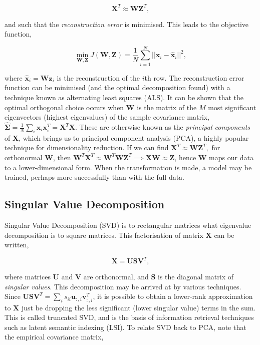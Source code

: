 \documentclass[11pt]{amsart}
\begin{document}
$$\mathbf{X}^T \approx \mathbf{W}\mathbf{Z}^T,$$

and such that the \emph{reconstruction error} is minimised. This leads to the objective function,

$$\min_{\mathbf{W}, \mathbf{Z}} J(\mathbf{W}, \mathbf{Z}) = \frac{1}{N}\sum_{i=1}^N||\mathbf{x}_i - \hat{\mathbf{x}}_i||^2,$$

where $\hat{\mathbf{x}}_i = \mathbf{W}\mathbf{z}_i$ is the reconstruction of the $i$th row. The reconstruction error function can be minimised (and the optimal decomposition found) with a technique known as alternating least squares (ALS). It can be shown that the optimal orthogonal choice occurs when $\mathbf{W}$ is the matrix of the $M$ most significant eigenvectors (highest eigenvalues) of the sample covariance matrix, $\hat{\boldsymbol\Sigma} = \frac{1}{N}\sum_i\mathbf{x}_i\mathbf{x}_i^T = \mathbf{X}^T\mathbf{X}$. These are otherwise known as the \emph{principal components} of $\mathbf{X}$, which brings us to principal component analysis (PCA), a highly popular technique for dimensionality reduction. If we can find $\mathbf{X}^T \approx \mathbf{W}\mathbf{Z}^T,$ for orthonormal $\mathbf{W}$, then $\mathbf{W}^T\mathbf{X}^T \approx \mathbf{W}^T\mathbf{W}\mathbf{Z}^T \implies \mathbf{X}\mathbf{W}  \approx \mathbf{Z}$, hence $\mathbf{W}$ maps our data to a lower-dimensional form. When the transformation is made, a model may be trained, perhaps more successfully than with the full data.

\subsection{Singular Value Decomposition}

Singular Value Decomposition (SVD) is to rectangular matrices what eigenvalue decomposition is to square matrices. This factorisation of matrix $\mathbf{X}$ can be written,

$$\mathbf{X} = \mathbf{U}\mathbf{S}\mathbf{V}^T,$$

where matrices $\mathbf{U}$ and $\mathbf{V}$ are orthonormal, and $\mathbf{S}$ is the diagonal matrix of \emph{singular values}. This decomposition may be arrived at by various techniques. Since $\mathbf{U}\mathbf{S}\mathbf{V}^T = \sum_i s_{ii} \mathbf{u}_{:,i}\mathbf{v}_{:,i}^T$, it is possible to obtain a lower-rank approximation to $\mathbf{X}$ just be dropping the less significant (lower singular value) terms in the sum. This is called truncated SVD, and is the basis of information retrieval techniques such as latent semantic indexing (LSI). To relate SVD back to PCA, note that the empirical covariance matrix,
\end{document}
